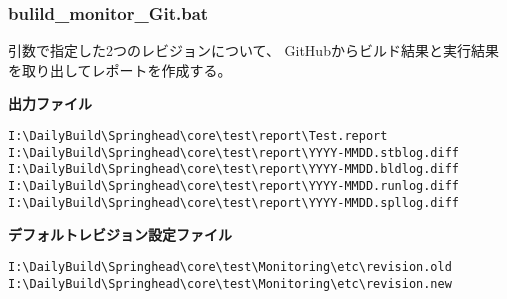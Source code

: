 \subsubsection{bulild\_monitor\_Git.bat}
\label{subsubsec:buildmonitorGit}

\medskip
\noindent
引数で指定した2つのレビジョンについて、
GitHubからビルド結果と実行結果を取り出してレポートを作成する。

\medskip
{}
\begin{Opts}[b][5em]
\end{Opts}
\begin{Args}[b][4em]
\end{Args}

\medskip
\noindent
\bf{出力ファイル}
\begin{narrow}[\WID]
	\verb|I:\DailyBuild\Springhead\core\test\report\Test.report|\\
	\verb|I:\DailyBuild\Springhead\core\test\report\YYYY-MMDD.stblog.diff|\\
	\verb|I:\DailyBuild\Springhead\core\test\report\YYYY-MMDD.bldlog.diff|\\
	\verb|I:\DailyBuild\Springhead\core\test\report\YYYY-MMDD.runlog.diff|\\
	\verb|I:\DailyBuild\Springhead\core\test\report\YYYY-MMDD.spllog.diff|
\end{narrow}

\medskip
\noindent
\bf{デフォルトレビジョン設定ファイル}
\begin{narrow}[\WID]
	\verb|I:\DailyBuild\Springhead\core\test\Monitoring\etc\revision.old|\\
	\verb|I:\DailyBuild\Springhead\core\test\Monitoring\etc\revision.new|
\end{narrow}

